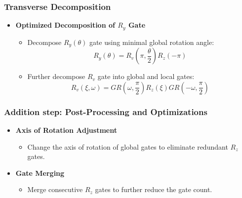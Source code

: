\documentclass[18 pt]{beamer}
\begin{document}
\begin{frame}
    \frametitle{Transverse Decomposition}
    \begin{itemize}
        \item \textbf{Optimized Decomposition of $R_y$ Gate}
        \begin{itemize}
            \item Decompose $R_y(\theta)$ gate using minimal global rotation angle:
            \[
            R_y(\theta) = R_v\left(\pi, \frac{\theta}{2}\right) R_z(-\pi)
            \]
            \item Further decompose $R_v$ gate into global and local gates:
            \[
            R_v(\xi, \omega) = GR(\omega, \frac{\pi}{2}) R_z(\xi) GR(-\omega, \frac{\pi}{2})
            \]
        \end{itemize}
    \end{itemize}
\end{frame}
\begin{frame}
    \frametitle{Addition step: Post-Processing and Optimizations}
    \begin{itemize}
        \item \textbf{Axis of Rotation Adjustment}
        \begin{itemize}
            \item Change the axis of rotation of global gates to eliminate redundant $R_z$ gates.
        \end{itemize}
        \item \textbf{Gate Merging}
        \begin{itemize}
            \item Merge consecutive $R_z$ gates to further reduce the gate count.
        \end{itemize}
    \end{itemize}
\end{frame}
\end{document}
